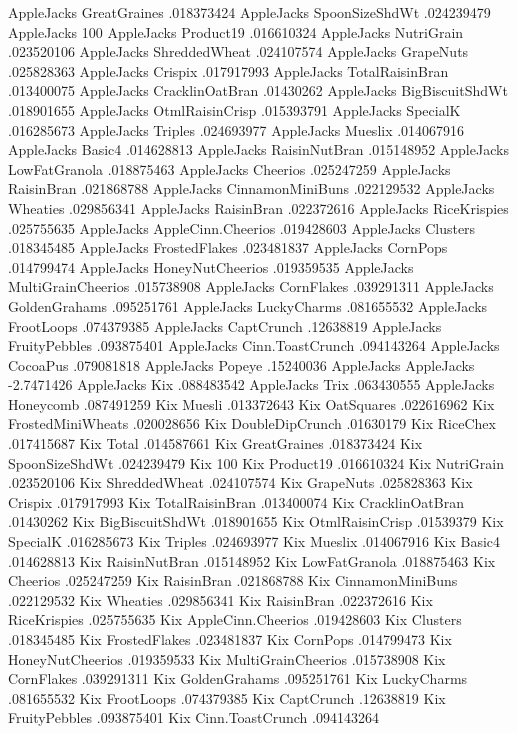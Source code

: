 AppleJacks	GreatGraines	.018373424
AppleJacks	SpoonSizeShdWt	.024239479
AppleJacks	100%
AppleJacks	Product19	.016610324
AppleJacks	NutriGrain	.023520106
AppleJacks	ShreddedWheat	.024107574
AppleJacks	GrapeNuts	.025828363
AppleJacks	Crispix	.017917993
AppleJacks	TotalRaisinBran	.013400075
AppleJacks	CracklinOatBran	.01430262
AppleJacks	BigBiscuitShdWt	.018901655
AppleJacks	OtmlRaisinCrisp	.015393791
AppleJacks	SpecialK	.016285673
AppleJacks	Triples	.024693977
AppleJacks	Mueslix	.014067916
AppleJacks	Basic4	.014628813
AppleJacks	RaisinNutBran	.015148952
AppleJacks	LowFatGranola	.018875463
AppleJacks	Cheerios	.025247259
AppleJacks	RaisinBran	.021868788
AppleJacks	CinnamonMiniBuns	.022129532
AppleJacks	Wheaties	.029856341
AppleJacks	RaisinBran	.022372616
AppleJacks	RiceKrispies	.025755635
AppleJacks	AppleCinn.Cheerios	.019428603
AppleJacks	Clusters	.018345485
AppleJacks	FrostedFlakes	.023481837
AppleJacks	CornPops	.014799474
AppleJacks	HoneyNutCheerios	.019359535
AppleJacks	MultiGrainCheerios	.015738908
AppleJacks	CornFlakes	.039291311
AppleJacks	GoldenGrahams	.095251761
AppleJacks	LuckyCharms	.081655532
AppleJacks	FrootLoops	.074379385
AppleJacks	CaptCrunch	.12638819
AppleJacks	FruityPebbles	.093875401
AppleJacks	Cinn.ToastCrunch	.094143264
AppleJacks	CocoaPus	.079081818
AppleJacks	Popeye	.15240036
AppleJacks	AppleJacks	-2.7471426
AppleJacks	Kix	.088483542
AppleJacks	Trix	.063430555
AppleJacks	Honeycomb	.087491259
Kix	Muesli	.013372643
Kix	OatSquares	.022616962
Kix	FrostedMiniWheats	.020028656
Kix	DoubleDipCrunch	.01630179
Kix	RiceChex	.017415687
Kix	Total	.014587661
Kix	GreatGraines	.018373424
Kix	SpoonSizeShdWt	.024239479
Kix	100%
Kix	Product19	.016610324
Kix	NutriGrain	.023520106
Kix	ShreddedWheat	.024107574
Kix	GrapeNuts	.025828363
Kix	Crispix	.017917993
Kix	TotalRaisinBran	.013400074
Kix	CracklinOatBran	.01430262
Kix	BigBiscuitShdWt	.018901655
Kix	OtmlRaisinCrisp	.01539379
Kix	SpecialK	.016285673
Kix	Triples	.024693977
Kix	Mueslix	.014067916
Kix	Basic4	.014628813
Kix	RaisinNutBran	.015148952
Kix	LowFatGranola	.018875463
Kix	Cheerios	.025247259
Kix	RaisinBran	.021868788
Kix	CinnamonMiniBuns	.022129532
Kix	Wheaties	.029856341
Kix	RaisinBran	.022372616
Kix	RiceKrispies	.025755635
Kix	AppleCinn.Cheerios	.019428603
Kix	Clusters	.018345485
Kix	FrostedFlakes	.023481837
Kix	CornPops	.014799473
Kix	HoneyNutCheerios	.019359533
Kix	MultiGrainCheerios	.015738908
Kix	CornFlakes	.039291311
Kix	GoldenGrahams	.095251761
Kix	LuckyCharms	.081655532
Kix	FrootLoops	.074379385
Kix	CaptCrunch	.12638819
Kix	FruityPebbles	.093875401
Kix	Cinn.ToastCrunch	.094143264
